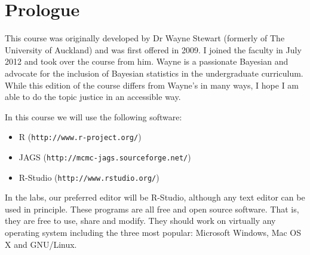 \section{Prologue}

This course was originally developed by Dr Wayne Stewart (formerly of The
University of
Auckland) and was first offered in 2009. I joined the faculty in July 2012
and took over the course from him. Wayne is a passionate Bayesian and advocate
for the inclusion of Bayesian statistics in the undergraduate curriculum.
While this edition of the course differs from Wayne's in many ways, I hope I am
able to do the topic justice in an accessible way.

In this course we will use the following software:
\begin{itemize}
\item R ({\tt http://www.r-project.org/}) \\
\item JAGS ({\tt http://mcmc-jags.sourceforge.net/}) \\
\item R-Studio ({\tt http://www.rstudio.org/})
\end{itemize}
In the labs, our preferred editor will be R-Studio, although any text editor
can be used in principle. These programs are all free and open source software.
That is, they are free to use, share and modify. They should work on
virtually any operating system including the three most popular:
Microsoft Windows, Mac OS X and GNU/Linux.

